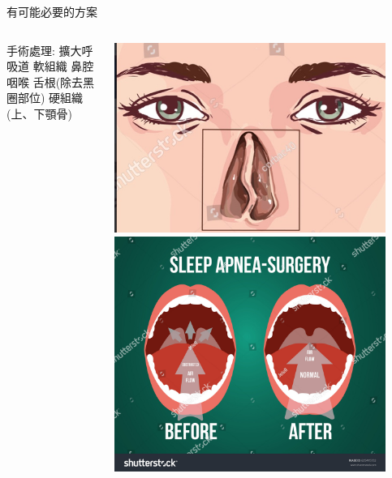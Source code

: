 \documentclass[aspectratio=169]{beamer}
\begin{document}
\begin{frame}{有可能必要的方案}
    \begin{columns}
    
    \begin{outline}
     手術處理: 擴大呼吸道
         軟組織
             鼻腔
             咽喉
             舌根(除去黑圈部位)
         硬組織(上、下顎骨)
    \end{outline}
    
    \centering
    \includegraphics[width=0.9\textwidth]{nasal_septum.jpg}
    \includegraphics[width=0.9\textwidth]{stock-vector-vector-illustration-of-surgery-for-obstructive-sleep-apnea-before-and-after-result-625415732.jpg}

\end{columns}
\end{frame}
\end{document}

